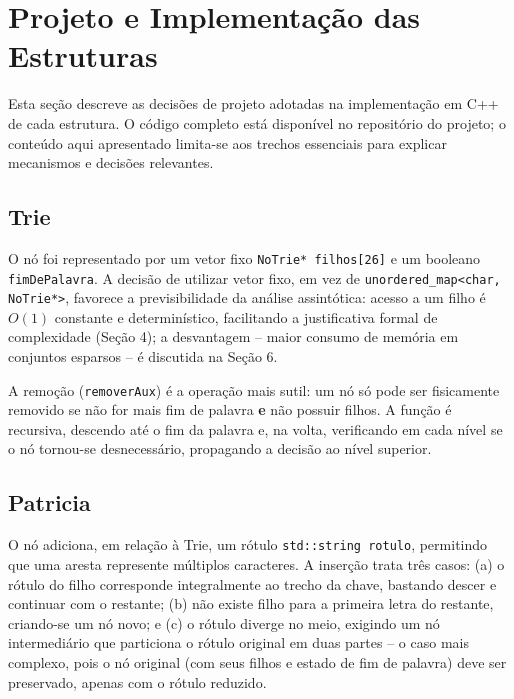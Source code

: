 \documentclass[11pt]{article}
\begin{document}
\section{Projeto e Implementação das Estruturas}

Esta seção descreve as decisões de projeto adotadas na implementação em C++ de
cada estrutura. O código completo está disponível no repositório do projeto; o
conteúdo aqui apresentado limita-se aos trechos essenciais para explicar
mecanismos e decisões relevantes.

\subsection{Trie}

O nó foi representado por um vetor fixo \texttt{NoTrie* filhos[26]} e um
booleano \texttt{fimDePalavra}. A decisão de utilizar vetor fixo, em vez de
\texttt{unordered\_map<char, NoTrie*>}, favorece a previsibilidade da análise
assintótica: acesso a um filho é $O(1)$ constante e determinístico, facilitando
a justificativa formal de complexidade (Seção 4); a desvantagem -- maior
consumo de memória em conjuntos esparsos -- é discutida na Seção 6.

A remoção (\texttt{removerAux}) é a operação mais sutil: um nó só pode ser
fisicamente removido se não for mais fim de palavra \textbf{e} não possuir
filhos. A função é recursiva, descendo até o fim da palavra e, na volta,
verificando em cada nível se o nó tornou-se desnecessário, propagando a
decisão ao nível superior.

\subsection{Patricia}

O nó adiciona, em relação à Trie, um rótulo \texttt{std::string rotulo},
permitindo que uma aresta represente múltiplos caracteres. A inserção trata
três casos: (a) o rótulo do filho corresponde integralmente ao trecho da
chave, bastando descer e continuar com o restante; (b) não existe filho para a
primeira letra do restante, criando-se um nó novo; e (c) o rótulo diverge no
meio, exigindo um nó intermediário que particiona o rótulo original em duas
partes -- o caso mais complexo, pois o nó original (com seus filhos e estado
de fim de palavra) deve ser preservado, apenas com o rótulo reduzido.
\end{document}
